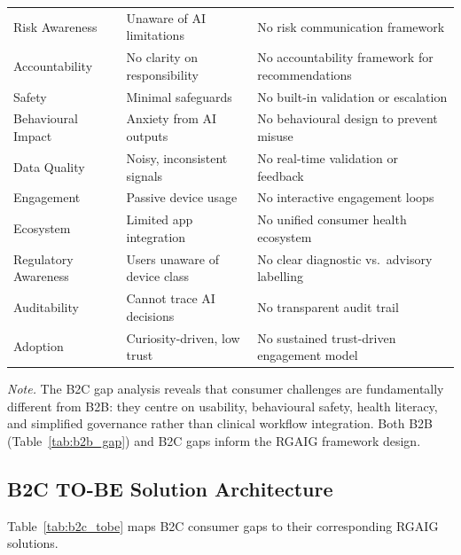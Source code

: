 {\begin{xltabular}{\textwidth}{@{} >{\raggedright\arraybackslash}p{3.2cm} L L @{}}
\addlinespace
Risk Awareness & Unaware of AI limitations & No risk communication framework \\
\addlinespace
Accountability & No clarity on responsibility & No accountability framework for recommendations \\
\addlinespace
Safety & Minimal safeguards & No built-in validation or escalation \\
\addlinespace
Behavioural Impact & Anxiety from AI outputs & No behavioural design to prevent misuse \\
\addlinespace
Data Quality & Noisy, inconsistent signals & No real-time validation or feedback \\
\addlinespace
Engagement & Passive device usage & No interactive engagement loops \\
\addlinespace
Ecosystem & Limited app integration & No unified consumer health ecosystem \\
\addlinespace
Regulatory Awareness & Users unaware of device class & No clear diagnostic vs.\ advisory labelling \\
\addlinespace
Auditability & Cannot trace AI decisions & No transparent audit trail \\
\addlinespace
Adoption & Curiosity-driven, low trust & No sustained trust-driven engagement model \\
\end{xltabular}}
\vspace{0.5em}
\noindent\textit{Note.} The B2C gap analysis reveals that consumer challenges are fundamentally different from B2B: they centre on usability, behavioural safety, health literacy, and simplified governance rather than clinical workflow integration. Both B2B (Table~\ref{tab:b2b_gap}) and B2C gaps inform the RGAIG framework design.
\fi


\iffalse %
\subsection{B2C TO-BE Solution Architecture}
\label{sec:b2c_tobe}

Table~\ref{tab:b2c_tobe} maps B2C consumer gaps to their corresponding RGAIG solutions.


